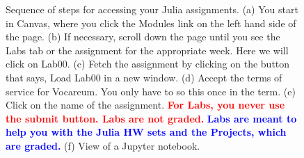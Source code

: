 \begin{figure}[htb!]%
\centering
{}
\hspace{5pt}%
\hspace{5pt}%
\hspace{5pt}%
\hspace{5pt}%
\hspace{5pt}%
    \caption[]{Sequence of steps for accessing your Julia assignments. (a) You start in Canvas, where you click the Modules link on the left hand side of the page. (b) If necessary, scroll down the page until you see the Labs tab or the assignment for the appropriate week. Here we will click on Lab00. (c) Fetch the assignment by clicking on the button that says, Load Lab00 in a new window.  (d) Accept the terms of service for Vocareum. You only have to so this once in the term. (e) Click on the name of the assignment. \textcolor{red}{\bf For Labs, you never use the submit button. Labs are not graded.}  \textcolor{blue}{\bf Labs are meant to help you with the Julia HW sets and the Projects, which are graded.} (f) View of a Jupyter notebook.}
    \label{fig:IllumiDesk}
\end{figure}


